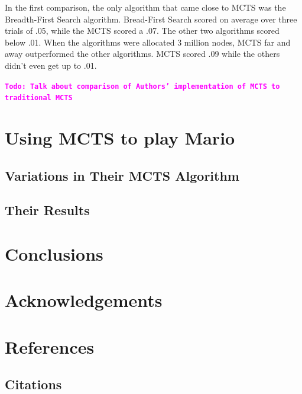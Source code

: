 \documentclass{sig-alternate}
\newcommand{\comment}[1]{{\bf \tt  {#1}}}
\newcommand{\todo}[1]{\textcolor{magenta}{\comment{Todo: {#1}}}}
\begin{document}
In the first comparison, the only algorithm that came close to MCTS was the Breadth-First Search algorithm. Bread-First Search scored on average over three trials of .05, while the MCTS scored a .07. The other two algorithms scored below .01. When the algorithms were allocated 3 million nodes, MCTS far and away outperformed the other algorithms. MCTS scored .09 while the others didn't even get up to .01.

\todo{Talk about comparison of Authors' implementation of MCTS to traditional MCTS}

\section{Using MCTS to play Mario}

\subsection{Variations in Their MCTS Algorithm}

\subsection{Their Results}

\section{Conclusions}

\section{Acknowledgements}

\section{References}

\subsection{Citations}


  
\end{document}
